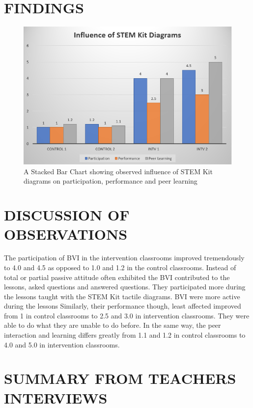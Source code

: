 \documentclass[11.5pt]{sig-alternate} %
\begin{document}
\begin{large}
\section*{FINDINGS}

\begin{figure}[!h]
    \centering
    \includegraphics[width=1\linewidth]{images/fig7.png}
    \caption{A Stacked Bar Chart showing observed influence of STEM Kit\textcopyright{} diagrams on participation, performance and peer learning}
\end{figure}

\section*{DISCUSSION OF OBSERVATIONS}

The participation of BVI in the intervention classrooms improved tremendously to 4.0 and 4.5 as opposed to 1.0 and 1.2 in the control classrooms. Instead of total or partial passive attitude often exhibited the BVI contributed to the lessons, asked questions and answered questions. They participated more during the lessons taught with the STEM Kit\textcopyright{} tactile diagrams. BVI were more active during the lessons Similarly, their performance though, least affected improved from 1 in control classrooms to 2.5 and 3.0 in intervention classrooms. They were able to do what they are unable to do before. In the same way, the peer interaction and learning differs greatly from 1.1 and 1.2 in control classrooms to 4.0 and 5.0 in intervention classrooms.

\section*{SUMMARY FROM TEACHERS INTERVIEWS}


\end{large}
\end{document}

